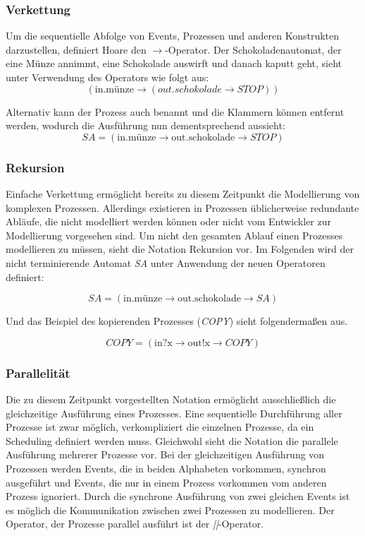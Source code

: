 \subsubsection{Verkettung}
Um die sequentielle Abfolge von Events, Prozessen und anderen Konstrukten darzustellen, definiert Hoare den 
$ \rightarrow $-Operator. Der Schokoladenautomat, der eine Münze annimmt, eine Schokolade auswirft und danach kaputt geht, sieht unter Verwendung des Operators wie folgt aus:
\[(\text{in.münze} \rightarrow (out.schokolade \rightarrow STOP))\]

Alternativ kann der Prozess auch benannt und die Klammern können entfernt werden, wodurch die Ausführung nun dementsprechend aussieht: 
\[SA = (\text{in.münze} \rightarrow \text{out.schokolade} \rightarrow STOP)\]

\subsubsection{Rekursion}
Einfache Verkettung ermöglicht bereits zu diesem Zeitpunkt die Modellierung von komplexen Prozessen. Allerdings existieren in Prozessen üblicherweise redundante Abläufe, die nicht modelliert werden können oder nicht vom Entwickler zur Modellierung vorgesehen sind. Um nicht den gesamten Ablauf einen Prozesses modellieren zu müssen, sieht die Notation Rekursion vor. Im Folgenden wird der nicht terminierende Automat \textit{SA} unter Anwendung der neuen Operatoren definiert:

\[SA = (\text{in.münze} \rightarrow \text{out.schokolade} \rightarrow SA)\]

Und das Beispiel des kopierenden Prozesses (\textit{COPY}) sieht folgendermaßen aus.

\[COPY = (\text{in?x} \rightarrow \text{out!x} \rightarrow COPY)\]

\subsubsection{Parallelität}
Die zu diesem Zeitpunkt vorgestellten Notation ermöglicht ausschließlich die gleichzeitige Ausführung eines Prozesses. Eine sequentielle Durchführung aller Prozesse ist zwar möglich, verkompliziert die einzelnen Prozesse, da ein Scheduling definiert werden muss. Gleichwohl sieht die Notation die parallele Ausführung mehrerer Prozesse vor. Bei der gleichzeitigen Ausführung von Prozessen werden Events, die in beiden Alphabeten vorkommen, synchron ausgeführt und Events, die nur in einem Prozess vorkommen vom anderen Prozess ignoriert. Durch die synchrone Ausführung von zwei gleichen Events ist es möglich die Kommunikation zwischen zwei Prozessen zu modellieren. Der Operator, der Prozesse parallel ausführt ist der \textit{||}-Operator. 


